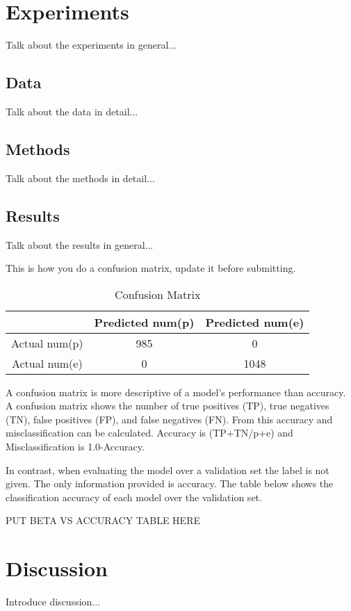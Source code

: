 \documentclass{IEEEtran}
\begin{document}
\section{Experiments}
Talk about the experiments in general...

\subsection{Data}
Talk about the data in detail...

\subsection{Methods}
Talk about the methods in detail...

\subsection{Results}
Talk about the results in general...

This is how you do a confusion matrix, update it before submitting.
\begin{table}[ht]
  \caption{Confusion Matrix}
  \centering
  \begin{tabular}{c c c }
  \hline\hline
                & Predicted num(p) & Predicted num(e) \\ [0.5ex]
  \hline
  Actual num(p) &              985 &                0 \\
  Actual num(e) &                0 &             1048 \\ [1ex]
  \hline
  \end{tabular}
  \label{table:nonlin}
\end{table}

A confusion matrix is more descriptive of a model's performance than
accuracy. A confusion matrix shows the number of true positives (TP), true
negatives (TN), false positives (FP), and false negatives (FN). From this accuracy
and misclassification can be calculated. Accuracy is (TP+TN/p+e) and
Misclassification is 1.0-Accuracy.

In contrast, when evaluating the model over a validation set the label
is not given. The only information provided is accuracy. The table
below shows the classification accuracy of each model over the
validation set.

PUT BETA VS ACCURACY TABLE HERE

\section{Discussion}
Introduce discussion...
\end{document}
